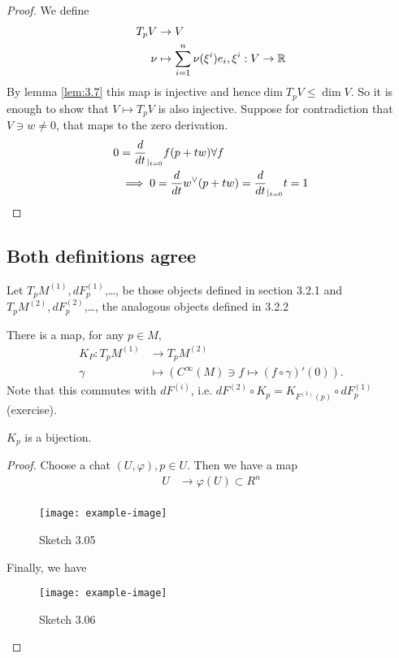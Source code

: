 \begin{proof} %
    We define \begin{align*}
        T_p V &\to V\\
        \nu&\mapsto \sum_{i=1}^n\nu(\xi^i)e_i,\xi^i:V\to \mathbb{R}
    \end{align*}
    By lemma \ref{lem:3.7} this map is injective and hence\(\dim T_pV \leq \dim V\). So it is enough to show that \(V\mapsto T_pV\) is also injective. 
    Suppose for contradiction that \(V\ni w\neq 0\), that maps to the zero derivation.
    \begin{align*}
        0&=\frac{d}{dt}_{|_{t=0}}f(p+tw)\forall f\\
        &\implies 0=\frac{d}{dt}w^\vee(p+tw)=\frac{d}{dt}_{|_{t=0}}t=1 \qedhere
    \end{align*}
\end{proof}

\subsection{Both definitions agree}
 Let \(T_pM^{(1)},dF_p^{(1)}\),\dots, be those objects defined in section 3.2.1 
and  \(T_pM^{(2)},dF_p^{(2)}\),\dots, the analogous objects defined in 3.2.2 

 There is a  map, for any  \(p\in M\),
\begin{align*}
    K_P:T_pM^{(1)}&\to T_pM^{(2)}\\
    \gamma& \mapsto (C^\infty(M)\ni f\mapsto (f\circ \gamma)'(0)).
\end{align*}
Note that this commutes with \(dF^{(i)}\), i.e. \(dF^{(2)}\circ K_p=K_{F^{(1)}(p)}\circ dF_p^{(1)}\) (exercise).

\begin{proposition}\label{prop:3.9}
    \(K_p\) is a bijection.
\end{proposition}

\begin{proof}
    Choose a chat \((U,\varphi),p\in U\). Then we have a map
    \begin{align*}
        U &\to \varphi(U)\subset R^n\\
    \end{align*}
    \begin{figure}[H]
        \centering
        \texttt{[image: example-image]}
        \caption{Sketch 3.05}
    \end{figure}
    Finally, we have 
    \begin{figure}[H]
        \centering
        \texttt{[image: example-image]}
        \caption{Sketch 3.06}
    \end{figure}
\end{proof}

